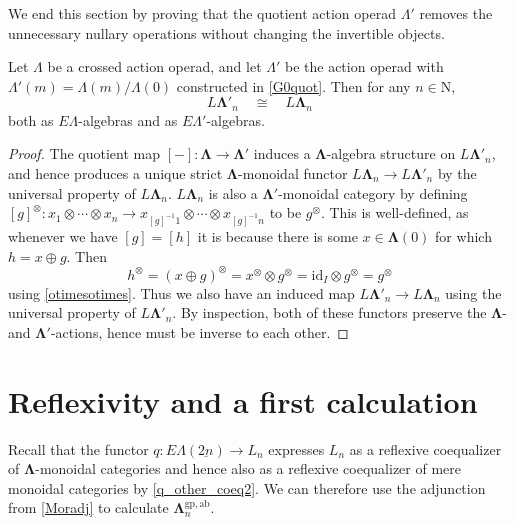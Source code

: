 \documentclass{amsbook} %
\newcommand{\id}{\textrm{id}}
\newcommand{\ML}{\mathbf{\Lambda}}
\newcommand{\MLn}{\mathbf{\Lambda}_n}
\newcommand{\ELnn}{E\Lambda(\underline{2n})}
\numberwithin{section}{chapter}
\begin{document}
We end this section by proving that the quotient action operad $\Lambda'$ removes the unnecessary nullary operations without changing the invertible objects.

\begin{thm} \label{noscalarcross} Let $\Lambda$ be a crossed action operad, and let $\Lambda'$ be the action operad with $\Lambda'(m) = \Lambda(m)/\Lambda(0)$ constructed in \cref{G0quot}. Then for any $n \in \mathrm{N}$,
\[ L\ML'_n \quad \cong \quad L\ML_n \]
both as $E\Lambda$-algebras and as $E\Lambda'$-algebras.  
\end{thm}
\begin{proof}
The quotient map $[-]:\ML \to \ML'$ induces a $\ML$-algebra structure on $L\ML'_n$, and hence produces a unique strict $\ML$-monoidal functor $L\ML_n \to L\ML'_n$ by the universal property of $L\ML_n$. $L\ML_n$ is also a $\ML'$-monoidal category by defining $[g]^{\otimes} : x_1 \otimes \cdots \otimes x_n \to x_{[g]^{-1}1} \otimes \cdots \otimes x_{[g]^{-1}n}$ to be $g^{\otimes}$. This is well-defined, as whenever we have $[g] = [h]$ it is because there is some $x \in \ML(0)$ for which $h = x \oplus g$. Then
\[
h^{\otimes} = (x \oplus g)^{\otimes} = x^{\otimes} \otimes g^{\otimes} = \id_I \otimes g^{\otimes} = g^{\otimes}
\]
using \cref{otimesotimes}. Thus we also have an induced map $L\ML'_n \to L\ML_n$ using the universal property of $L\ML'_n$. By inspection, both of these functors preserve the $\ML$- and $\ML'$-actions, hence must be inverse to each other.
\end{proof}

\section{Reflexivity and a first calculation}

Recall that the functor $q: \ELnn \to L_n$ expresses $L_n$ as a reflexive coequalizer of $\ML$-monoidal categories and hence also as a reflexive coequalizer of mere monoidal categories by \cref{q_other_coeq2}. We can therefore use the adjunction from \cref{Moradj} to calculate $\MLn^{\mathrm{gp},\mathrm{ab}}$. 
\end{document}
